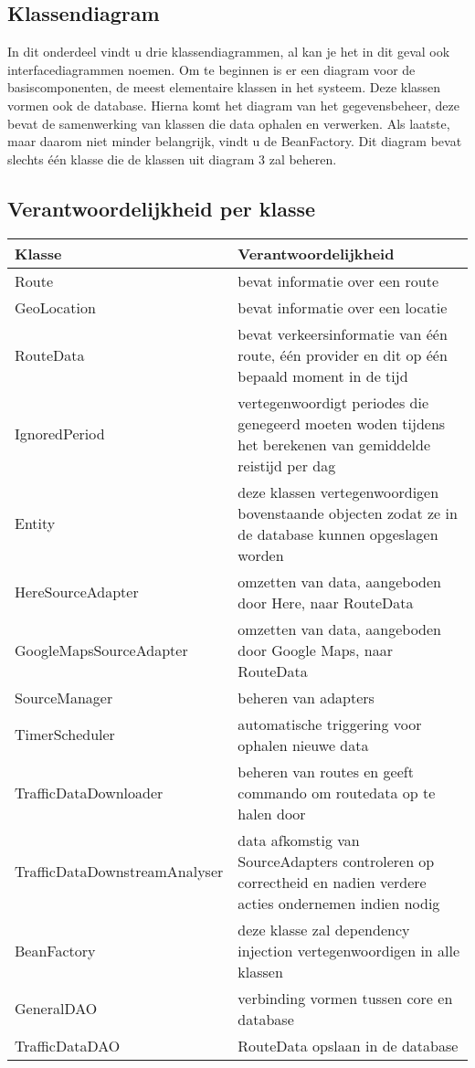 \documentclass[ps,a4paper,oneside]{report}
\begin{document}
\subsection{Klassendiagram}
In dit onderdeel vindt u drie klassendiagrammen, al kan je het in dit geval ook interfacediagrammen noemen. Om te beginnen is er een diagram voor de basiscomponenten, de meest elementaire klassen in het systeem. Deze klassen vormen ook de database. Hierna komt het diagram van het gegevensbeheer, deze bevat de samenwerking van klassen die data ophalen en verwerken. Als laatste, maar daarom niet minder belangrijk, vindt u de BeanFactory. Dit diagram bevat slechts \'e\'en klasse die de klassen uit diagram 3 zal beheren.
\subsection{Verantwoordelijkheid per klasse}
\begin{tabular}{ | l | p{6.5cm}| }
	\hline
	\textbf{Klasse} & \textbf{Verantwoordelijkheid} \\
	\hline
	Route & bevat informatie over een route \\
	\hline
	GeoLocation & bevat informatie over een locatie \\
	\hline
	RouteData & bevat verkeersinformatie van \'e\'en route, \'e\'en provider en dit op \'e\'en bepaald moment in de tijd \\
	\hline
	IgnoredPeriod & vertegenwoordigt periodes die genegeerd moeten woden tijdens het berekenen van gemiddelde reistijd per dag\\
	\hline
	[Object]Entity & deze klassen vertegenwoordigen bovenstaande objecten zodat ze in de database kunnen opgeslagen worden\\
	\hline
	HereSourceAdapter & omzetten van data, aangeboden door Here, naar RouteData\\	
	\hline
	GoogleMapsSourceAdapter & omzetten van data, aangeboden door Google Maps, naar RouteData\\	
	\hline
	SourceManager & beheren van adapters\\	
	\hline
	TimerScheduler & automatische triggering voor ophalen nieuwe data\\	
	\hline
	TrafficDataDownloader & beheren van routes en geeft commando om routedata op te halen door\\	
	\hline
	TrafficDataDownstreamAnalyser & data afkomstig van SourceAdapters controleren op correctheid en nadien verdere acties ondernemen indien nodig\\		
	\hline
	BeanFactory & deze klasse zal dependency injection vertegenwoordigen in alle klassen \\	
	\hline
	GeneralDAO & verbinding vormen tussen core en database\\	
	\hline
	TrafficDataDAO & RouteData opslaan in de database\\	
	\hline
\end{tabular}
\end{document}

